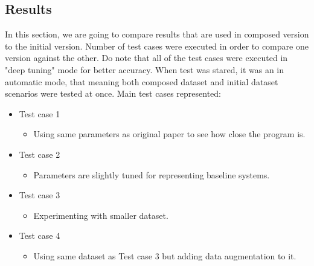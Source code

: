 \subsection{Results}
In this section, we are going to compare results that are used in composed version to the initial version. Number of test cases were executed in order to compare one version against the other. Do note that all of the test cases were executed in "deep tuning" mode for better accuracy. When test was stared, it was an in automatic mode, that meaning both composed dataset and initial dataset scenarios were tested at once.
\newline
Main test cases represented:
\begin{itemize}
  \item Test case 1
  \begin{itemize}
    \item Using same parameters as original paper to see how close the program is.
  \end{itemize}
  
  \item Test case 2
  \begin{itemize}
    \item Parameters are slightly tuned for representing baseline systems.
  \end{itemize}
  
  \item Test case 3
  \begin{itemize}
      \item Experimenting with smaller dataset.
  \end{itemize}
  
  \item Test case 4
  \begin{itemize}
      \item Using same dataset as Test case 3 but adding data augmentation to it.
  \end{itemize}

\end{itemize}







